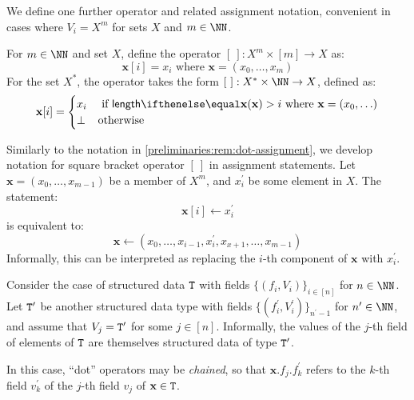We define one further operator and related assignment notation, convenient in cases where $V_i = X^m$ for sets $X$ and $m \in \NN$.
\begin{definition}\label{def:squareb-operator}
  For $m \in \NN$ and set $X$, define the operator $[\ ] : X^m \times [m] \to X$ as:
  \[
    \mathbf{x}[i] = x_i \text{ where } \mathbf{x} = (x_0, \ldots, x_m)
  \]
  For the set $X^*$, the operator takes the form $[\ ] : X^* \times \NN \to X$, defined as:
  \[
    \mathbf{x}[i] =
    \begin{cases}
        x_i & \text{ if } \len{\mathbf{x}} > i \text{ where } \mathbf{x} = (x_0, \ldots) \\
        \bot & \text{otherwise}
    \end{cases}
  \]
\end{definition}

\begin{remark}
  Similarly to the notation in \cref{preliminaries:rem:dot-assignment}, we develop notation for square bracket operator $[\ ]$ in assignment statements.
  Let $\mathbf{x} = (x_0, \ldots, x_{m-1})$ be a member of $X^m$, and $x_i^\prime$ be some element in $X$. The statement:
  \[
    \mathbf{x}[i] \gets x_i^\prime
  \]
  is equivalent to:
  \[
    \mathbf{x} \gets (x_0, \ldots, x_{i-1}, x_i^\prime, x_{x+1}, \ldots, x_{m-1})
  \]
  Informally, this can be interpreted as replacing the $i$-th component of $\mathbf{x}$ with $x_i^\prime$.
\end{remark}

\begin{remark}
Consider the case of structured data ${\mathtt{T}}$ with fields $\{(f_i, V_i)\}_{i \in [n]}$ for $n \in \NN$. Let ${\mathtt{T^\prime}}$ be another structured data type with fields $\{(f^\prime_i, V^\prime_i)\}_{n^\prime-1}$ for $n^\prime \in \NN$, and assume that $V_j = {\mathtt{T^\prime}}$ for some $j \in [n]$. Informally, the values of the $j$-th field of elements of ${\mathtt{T}}$ are themselves structured data of type ${\mathtt{T^\prime}}$.

In this case, ``dot'' operators may be \emph{chained}, so that $\mathbf{x}.f_j.f^\prime_k$ refers to the $k$-th field $v^\prime_k$ of the $j$-th field $v_j$ of $\mathbf{x} \in {\mathtt{T}}$.
\end{remark}

